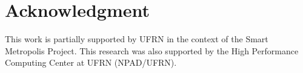 \documentclass[conference,retainorgcmds]{IEEEtran}
\begin{document}







\section*{Acknowledgment}
This work is partially supported by UFRN in the context of the Smart Metropolis Project. This research was also supported by the High Performance Computing Center at UFRN (NPAD/UFRN).



\appendices

% 
% 

\end{document}
